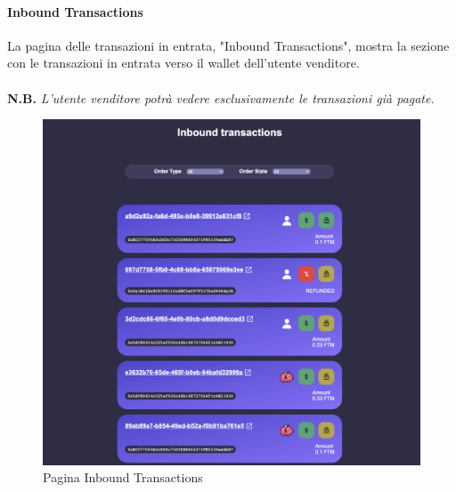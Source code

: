         \paragraph{Inbound Transactions}
        La pagina delle transazioni in entrata, "Inbound Transactions", mostra la sezione con le transazioni in entrata verso il wallet dell'utente venditore.\\\\
        \textbf{N.B.} \textit{L'utente venditore potrà vedere esclusivamente le transazioni già pagate.}\\
        \begin{figure}[H]
            \centering
            \includegraphics[scale=0.4]{immagini/Transaction/inboundTransactions.png}
            \caption{Pagina Inbound Transactions}
        \end{figure}
